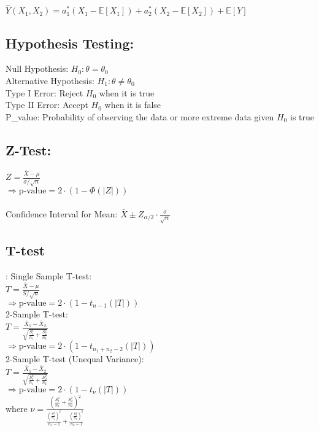 
$
\hat{Y}(X_1, X_2) = a_1^* (X_1 - \mathbb{E}[X_1]) + a_2^* (X_2 - \mathbb{E}[X_2]) + \mathbb{E}[Y]
$

\subsection{Hypothesis Testing:}
Null Hypothesis: $H_0: \theta = \theta_0$\\
Alternative Hypothesis: $H_1: \theta \neq \theta_0$\\
Type I Error: Reject $H_0$ when it is true\\
Type II Error: Accept $H_0$ when it is false\\
P\_value: Probability of observing the data or more extreme data given $H_0$ is true\\
\subsection{Z-Test:}
$Z = \frac{\bar{X} - \mu}{\sigma / \sqrt{n}}$\\
$\Rightarrow \text{p-value} = 2 \cdot (1 - \Phi(|Z|))$\\ \\
Confidence Interval for Mean: $\bar{X} \pm Z_{\alpha/2} \cdot \frac{\sigma}{\sqrt{n}}$\\

\subsection{T-test}:
Single Sample T-test:\\
$T = \frac{\bar{X} - \mu}{S / \sqrt{n}}$\\
$\Rightarrow \text{p-value} = 2 \cdot (1 - t_{n-1}(|T|))$\\
2-Sample T-test:\\
$T = \frac{\bar{X}_1 - \bar{X}_2}{\sqrt{\frac{S_1^2}{n_1} + \frac{S_2^2}{n_2}}}$\\
$\Rightarrow \text{p-value} = 2 \cdot (1 - t_{n_1 + n_2 - 2}(|T|))$\\
2-Sample T-test (Unequal Variance):\\
$T = \frac{\bar{X}_1 - \bar{X}_2}{\sqrt{\frac{S_1^2}{n_1} + \frac{S_2^2}{n_2}}}$\\
$\Rightarrow \text{p-value} = 2 \cdot (1 - t_{\nu}(|T|))$\\
where $\nu = \frac{\left(\frac{S_1^2}{n_1} + \frac{S_2^2}{n_2}\right)^2}{\frac{\left(\frac{S_1^2}{n_1}\right)^2}{n_1 - 1} + \frac{\left(\frac{S_2^2}{n_2}\right)^2}{n_2 - 1}}$\\


